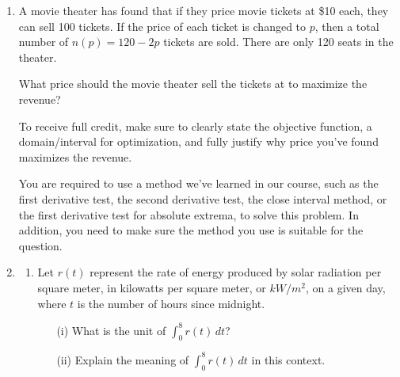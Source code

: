 \documentclass[11pt]{article}
\begin{document}
\begin{enumerate}
\newpage


\item A movie theater has found that if they price movie tickets at \$10 each, they can sell 100 tickets. If the price of each ticket is changed to $p$, then a total number of $n(p)=120-2p$ tickets are sold. There are only 120 seats in the theater.
 
What price should the movie theater sell the tickets at to maximize the revenue?

To receive full credit, make sure to clearly state the objective function, a domain/interval for optimization, and fully justify why price you've found maximizes the revenue. 

You are required to use a method we've learned in our course, such as the first derivative test, the second derivative test, the close interval method, or the first derivative test for absolute extrema, to solve this problem. In addition, you need to make sure the method you use is suitable for the question.


\newpage


\item 

\begin{enumerate}
    \item Let $r(t)$ represent the rate of energy produced by solar radiation per square meter, in kilowatts per square meter, or $kW/m^2$, on a given day, where $t$ is the number of hours since midnight.

    \begin{enumerate}
        \item[(i)] What is the unit of $\displaystyle\int_0^8 r(t)\, dt$?

        \vfill

        \item[(ii)] Explain the meaning of $\displaystyle\int_0^8 r(t)\, dt$ in this context.


\end{enumerate}
\end{enumerate}
\end{enumerate}
\end{document}

